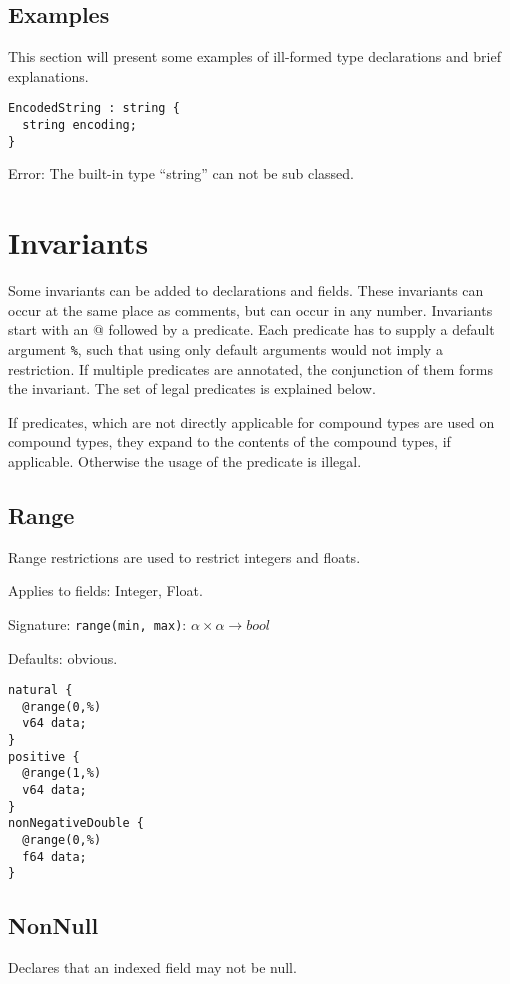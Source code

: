 \documentclass[a4paper,10pt]{article}
\begin{document}
\subsection{Examples}

This section will present some examples of ill-formed type declarations and brief explanations.

\begin{lstlisting}[label=stringExample,caption=Legal Super Types,language=skill]
EncodedString : string {
  string encoding;
}
\end{lstlisting}
Error: The built-in type ``string'' can not be sub classed.

\section{Invariants}
Some invariants can be added to declarations and fields. These invariants can occur at the same place as comments, but can occur in any number. Invariants start with an \textsc{@} followed by a predicate. Each predicate has to supply a default argument \texttt{\%}, such that using only default arguments would not imply a restriction.
If multiple predicates are annotated, the conjunction of them forms the invariant.
The set of legal predicates is explained below.

If predicates, which are not directly applicable for compound types are used on compound types, they expand to the contents of the compound types, if applicable. Otherwise the usage of the predicate is illegal.

\subsection*{Range}
Range restrictions are used to restrict integers and floats.

Applies to fields: Integer, Float.

Signature: \verb/range(min, max)/: $\alpha \times \alpha → bool$

Defaults: obvious.

\begin{lstlisting}[label=rangeExample,caption=Examples,language=skill]
natural {
  @range(0,%)
  v64 data;
}
positive {
  @range(1,%)
  v64 data;
}
nonNegativeDouble {
  @range(0,%)
  f64 data;
}
\end{lstlisting}

\subsection*{NonNull}
Declares that an indexed field may not be null.
\end{document}
